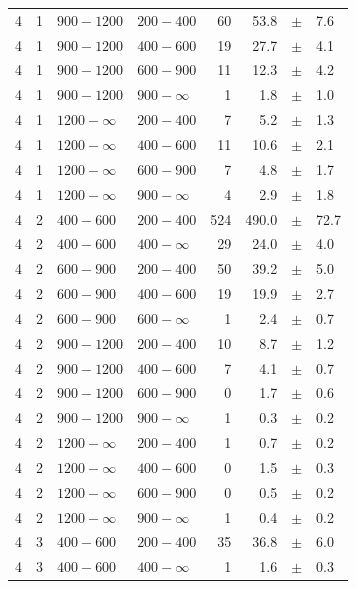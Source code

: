 \begin{table}[!h]
\begin{tabular}{rrllrrcl}
		4\T & 1 & $ 900-1200$ & $200-400$ &     60 &     53.8 &$\pm$&    7.6 \\
		4 & 1 & $ 900-1200$ & $400-600$ &     19 &     27.7 &$\pm$&    4.1 \\
		4 & 1 & $ 900-1200$ & $600-900$ &     11 &     12.3 &$\pm$&    4.2 \\
		4 & 1 & $ 900-1200$ & $900-\infty$ &      1 &      1.8 &$\pm$&    1.0 \\
		4\T & 1 & $1200- \infty$ & $200-400$ &      7 &      5.2 &$\pm$&    1.3 
		\\
		4 & 1 & $1200- \infty$ & $400-600$ &     11 &     10.6 &$\pm$&    2.1 \\
		4 & 1 & $1200- \infty$ & $600-900$ &      7 &      4.8 &$\pm$&    1.7 \\
		4 & 1 & $1200- \infty$ & $900-\infty$ &      4 &      2.9 &$\pm$&    
		1.8 \\
		4\T & 2 & $ 400- 600$ & $200-400$ &    524 &    490.0 &$\pm$&   72.7 \\
		4 & 2 & $ 400- 600$ & $400-\infty$ &     29 &     24.0 &$\pm$&    4.0 \\
		4\T & 2 & $ 600- 900$ & $200-400$ &     50 &     39.2 &$\pm$&    5.0 \\
		4 & 2 & $ 600- 900$ & $400-600$ &     19 &     19.9 &$\pm$&    2.7 \\
		4 & 2 & $ 600- 900$ & $600-\infty$ &      1 &      2.4 &$\pm$&    0.7 \\
		4\T & 2 & $ 900-1200$ & $200-400$ &     10 &      8.7 &$\pm$&    1.2 \\
		4 & 2 & $ 900-1200$ & $400-600$ &      7 &      4.1 &$\pm$&    0.7 \\
		4 & 2 & $ 900-1200$ & $600-900$ &      0 &      1.7 &$\pm$&    0.6 \\
		4 & 2 & $ 900-1200$ & $900-\infty$ &      1 &      0.3 &$\pm$&    0.2 \\
		4\T & 2 & $1200- \infty$ & $200-400$ &      1 &      0.7 &$\pm$&    0.2 
		\\
		4 & 2 & $1200- \infty$ & $400-600$ &      0 &      1.5 &$\pm$&    0.3 \\
		4 & 2 & $1200- \infty$ & $600-900$ &      0 &      0.5 &$\pm$&    0.2 \\
		4 & 2 & $1200- \infty$ & $900-\infty$ &      1 &      0.4 &$\pm$&    
		0.2 \\
		4\T & 3 & $ 400- 600$ & $200-400$ &     35 &     36.8 &$\pm$&    6.0 \\
		4 & 3 & $ 400- 600$ & $400-\infty$ &      1 &      1.6 &$\pm$&    0.3 \\

\end{tabular}
\end{table}
